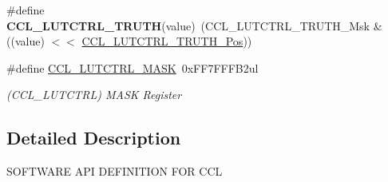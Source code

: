 \begin{DoxyCompactItemize}
\item 
\hypertarget{group___s_a_m_l21___c_c_l_ga4a8dc3df6d77e82cb956c8edbf09a444}{}\#define {\bfseries C\+C\+L\+\_\+\+L\+U\+T\+C\+T\+R\+L\+\_\+\+T\+R\+U\+T\+H}(value)~(C\+C\+L\+\_\+\+L\+U\+T\+C\+T\+R\+L\+\_\+\+T\+R\+U\+T\+H\+\_\+\+Msk \& ((value) $<$$<$ \hyperlink{group___s_a_m_l21___c_c_l_gab080b12c5cb04cea57afcb7c38b7e7ba}{C\+C\+L\+\_\+\+L\+U\+T\+C\+T\+R\+L\+\_\+\+T\+R\+U\+T\+H\+\_\+\+Pos}))\label{group___s_a_m_l21___c_c_l_ga4a8dc3df6d77e82cb956c8edbf09a444}

\item 
\hypertarget{group___s_a_m_l21___c_c_l_ga529e201f32c390da0ffe4798725473aa}{}\#define \hyperlink{group___s_a_m_l21___c_c_l_ga529e201f32c390da0ffe4798725473aa}{C\+C\+L\+\_\+\+L\+U\+T\+C\+T\+R\+L\+\_\+\+M\+A\+S\+K}~0x\+F\+F7\+F\+F\+F\+B2ul\label{group___s_a_m_l21___c_c_l_ga529e201f32c390da0ffe4798725473aa}

\begin{DoxyCompactList}\small\item\em (C\+C\+L\+\_\+\+L\+U\+T\+C\+T\+R\+L) M\+A\+S\+K Register \end{DoxyCompactList}\end{DoxyCompactItemize}


\subsection{Detailed Description}
S\+O\+F\+T\+W\+A\+R\+E A\+P\+I D\+E\+F\+I\+N\+I\+T\+I\+O\+N F\+O\+R C\+C\+L 